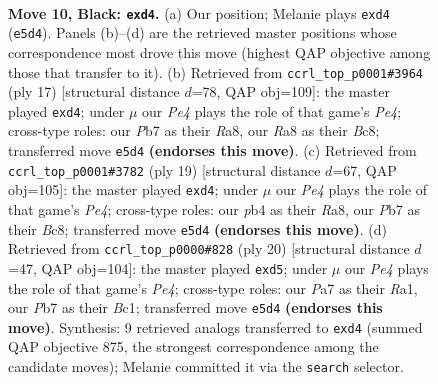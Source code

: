 \documentclass[11pt]{article}
\begin{document}
\clearpage

\begin{figure}[p]\centering
\begin{subfigure}{0.46\textwidth}\centering
\resizebox{\linewidth}{!}{%
\newchessgame
\chessboard[
  setfen={r1b1qrk1/pp1n1pbp/2pp1np1/4p3/PPPPP2P/2N2NP1/5PB1/R1BQK2R b KQ - 0 10},
  showmover=false,
  pgfstyle=straightmove, color=movearrow, markmove={e5-d4}
]}
\caption{}
\end{subfigure}\hfill
\begin{subfigure}{0.46\textwidth}\centering
\resizebox{\linewidth}{!}{%
\newchessgame
\chessboard[
  setfen={r1bqr1k1/pppn1pbp/3p1np1/4p3/2PPP3/2N2NP1/PP3PBP/R1BQR1K1 b - - 2 9},
  showmover=false,
  pgfstyle=straightmove, color=movearrow, markmove={e5-d4}
]}
\caption{}
\end{subfigure}
\\[4pt]
\begin{subfigure}{0.46\textwidth}\centering
\resizebox{\linewidth}{!}{%
\newchessgame
\chessboard[
  setfen={r1bq1rk1/1p1n1pbp/2pp1np1/p3p3/2PPP3/2N2NPP/PPQ2PB1/R1B2RK1 b - - 1 10},
  showmover=false,
  pgfstyle=straightmove, color=movearrow, markmove={e5-d4}
]}
\caption{}
\end{subfigure}\hfill
\begin{subfigure}{0.46\textwidth}\centering
\resizebox{\linewidth}{!}{%
\newchessgame
\chessboard[
  setfen={r1bqr1k1/1pp2pb1/2n2npp/p2pp3/P3P3/2PP1NP1/1P1N1PBP/R1BQR1K1 w - - 0 11},
  showmover=false,
  pgfstyle=straightmove, color=movearrow, markmove={e4-d5}
]}
\caption{}
\end{subfigure}
\caption{\textbf{Move 10, Black: \texttt{exd4}.} (a) Our position; Melanie plays \texttt{exd4} (\texttt{e5d4}). Panels (b)--(d) are the retrieved master positions whose correspondence most drove this move (highest QAP objective among those that transfer to it). (b) Retrieved from \texttt{ccrl\_top\_p0001\#3964} (ply 17) [structural distance $d$=78, QAP obj=109]: the master played \texttt{exd4}; under $\mu$ our \emph{Pe4} plays the role of that game's \emph{Pe4}; cross-type roles: our \emph{P}b7 as their \emph{R}a8, our \emph{R}a8 as their \emph{B}c8; transferred move \texttt{e5d4} \textbf{(endorses this move)}. (c) Retrieved from \texttt{ccrl\_top\_p0001\#3782} (ply 19) [structural distance $d$=67, QAP obj=105]: the master played \texttt{exd4}; under $\mu$ our \emph{Pe4} plays the role of that game's \emph{Pe4}; cross-type roles: our \emph{p}b4 as their \emph{R}a8, our \emph{P}b7 as their \emph{B}c8; transferred move \texttt{e5d4} \textbf{(endorses this move)}. (d) Retrieved from \texttt{ccrl\_top\_p0000\#828} (ply 20) [structural distance $d$=47, QAP obj=104]: the master played \texttt{exd5}; under $\mu$ our \emph{Pe4} plays the role of that game's \emph{Pe4}; cross-type roles: our \emph{P}a7 as their \emph{R}a1, our \emph{P}b7 as their \emph{B}c1; transferred move \texttt{e5d4} \textbf{(endorses this move)}. Synthesis: 9 retrieved analogs transferred to \texttt{exd4} (summed QAP objective 875, the strongest correspondence among the candidate moves); Melanie committed it via the \texttt{search} selector.}
\label{fig:thought-m19}
\end{figure}
\end{document}
